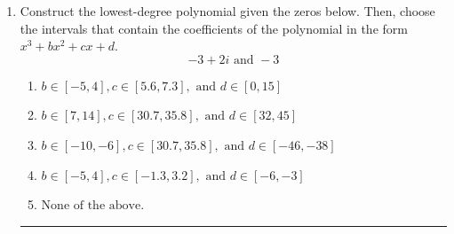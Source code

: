 \documentclass[14pt]{extbook}
\newcommand{\litem}[1]{\item#1\hspace*{-1cm}\rule{\textwidth}{0.4pt}}
\begin{document}
\begin{enumerate}
\litem{
Construct the lowest-degree polynomial given the zeros below. Then, choose the intervals that contain the coefficients of the polynomial in the form $x^3+bx^2+cx+d$.\[ -3 + 2 i \text{ and } -3 \]\begin{enumerate}[label=\Alph*.]
\item \( b \in [-5, 4], c \in [5.6, 7.3], \text{ and } d \in [0, 15] \)
\item \( b \in [7, 14], c \in [30.7, 35.8], \text{ and } d \in [32, 45] \)
\item \( b \in [-10, -6], c \in [30.7, 35.8], \text{ and } d \in [-46, -38] \)
\item \( b \in [-5, 4], c \in [-1.3, 3.2], \text{ and } d \in [-6, -3] \)
\item \( \text{None of the above.} \)


\end{enumerate}}
\end{enumerate}
\end{document}
